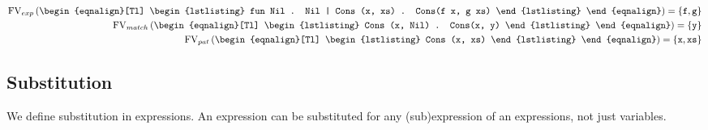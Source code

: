 \begin{example}
\label{ex:free-variables1}
\begin{eqnarray*}[c]
  \FV_{exp} \left(
    \begin{eqnalign}[Tl]
\begin{lstlisting}
fun Nil . Nil
  | Cons (x, xs) . Cons(f x, g xs)
\end{lstlisting}
    \end{eqnalign}
  \right) = \{\ttt{f}, \ttt{g} \} \\
%
  \FV_{match} \left(
    \begin{eqnalign}[Tl]
\begin{lstlisting}
Cons (x, Nil) . Cons(x, y)
\end{lstlisting}
    \end{eqnalign}
  \right) = \{\ttt{y}\} \\
%
  \FV_{pat} \left(
    \begin{eqnalign}[Tl]
\begin{lstlisting}
Cons (x, xs)
\end{lstlisting}
    \end{eqnalign}
  \right) = \{\ttt{x}, \ttt{xs}\} \\
\end{eqnarray*}
\end{example}

\subsection{Substitution}
We define substitution in expressions. An expression can be substituted for any
(sub)expression of an expressions, not just variables.

